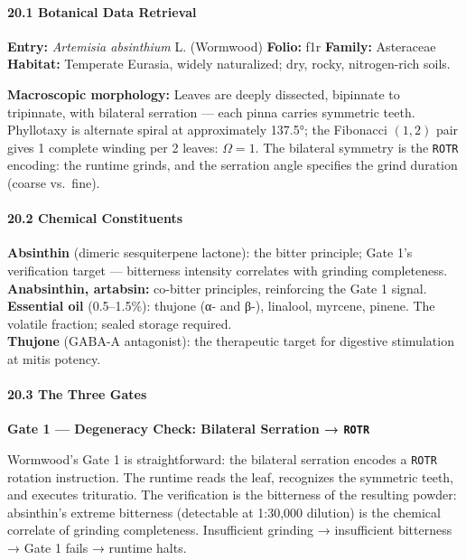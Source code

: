 \documentclass[12pt,a4paper]{article}
\begin{document}
\hypertarget{botanical-data-retrieval}{%
\paragraph{20.1 Botanical Data
Retrieval}\label{botanical-data-retrieval}}

\textbf{Entry:} \emph{Artemisia absinthium} L. (Wormwood)
\textbf{Folio:} f1r \textbf{Family:} Asteraceae \textbf{Habitat:}
Temperate Eurasia, widely naturalized; dry, rocky, nitrogen-rich soils.

\textbf{Macroscopic morphology:} Leaves are deeply dissected, bipinnate
to tripinnate, with bilateral serration --- each pinna carries symmetric
teeth. Phyllotaxy is alternate spiral at approximately 137.5°; the
Fibonacci \((1,2)\) pair gives 1 complete winding per 2 leaves:
\(\Omega = 1\). The bilateral symmetry is the \texttt{ROTR} encoding:
the runtime grinds, and the serration angle specifies the grind duration
(coarse vs.~fine).

\hypertarget{chemical-constituents}{%
\paragraph{20.2 Chemical Constituents}\label{chemical-constituents}}

\textbf{Absinthin} (dimeric sesquiterpene lactone): the bitter
principle; Gate 1's verification target --- bitterness intensity
correlates with grinding completeness.\\
\textbf{Anabsinthin, artabsin:} co-bitter principles, reinforcing the
Gate 1 signal.\\
\textbf{Essential oil} (0.5--1.5\%): thujone (α- and β-), linalool,
myrcene, pinene. The volatile fraction; sealed storage required.\\
\textbf{Thujone} (GABA-A antagonist): the therapeutic target for
digestive stimulation at mitis potency.

\hypertarget{the-three-gates}{%
\paragraph{20.3 The Three Gates}\label{the-three-gates}}

\textbf{Gate 1 --- Degeneracy Check: Bilateral Serration →
\texttt{ROTR}}

Wormwood's Gate 1 is straightforward: the bilateral serration encodes a
\texttt{ROTR} rotation instruction. The runtime reads the leaf,
recognizes the symmetric teeth, and executes trituratio. The
verification is the bitterness of the resulting powder: absinthin's
extreme bitterness (detectable at 1:30,000 dilution) is the chemical
correlate of grinding completeness. Insufficient grinding → insufficient
bitterness → Gate 1 fails → runtime halts.
\end{document}
